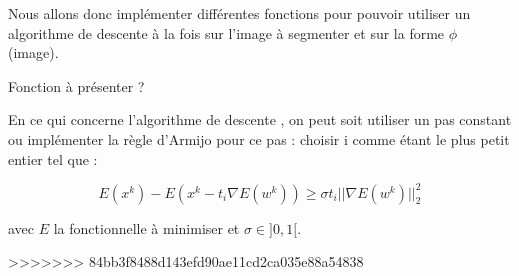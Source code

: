 Nous allons donc implémenter différentes fonctions pour pouvoir utiliser un algorithme de descente à la fois sur l'image à segmenter et sur la forme $\phi$ (image).

\bigskip

Fonction à présenter ? 

En ce qui concerne l'algorithme de descente , on peut soit utiliser un pas constant  ou implémenter la règle d'Armijo pour ce pas : choisir i comme étant le plus petit entier tel que : 

\[ E(x^k) - E(x^k - t_i \nabla E(w^k)) \geq \sigma t_i || \nabla E(w^k)||_2^2\] 

avec $E$ la fonctionnelle à minimiser et $\sigma \in ]0,1[$. 

>>>>>>> 84bb3f8488d143efd90ae11cd2ca035e88a54838
